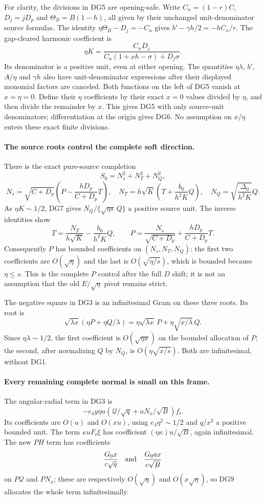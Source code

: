 For clarity, the divisions in DG5 are opening-safe. Write
$C_n=(1-r)C$, $D_j=jD_p$ and $\Theta_B=B(1-h)$, all given by their
unchanged unit-denominator source formulas. The identity
$\eta\Theta_B-D_j=-C_n$ gives
$b'-\gamma h/2=-hC_n/r$. The gap-cleared harmonic coefficient is
\[
 \eta K=\frac{C_nD_j}
 {C_n(1+xh-\sigma)+D_j\sigma}.
\]
Its denominator is a positive unit, even at either opening. The
quantities $\eta\lambda$, $b'$, $A/\eta$ and $\gamma h$ also have
unit-denominator expressions after their displayed monomial factors
are canceled. Both functions on the left of DG5 vanish at
$x=\eta=0$. Define their $\eta$ coefficients by their exact $x=0$
values divided by $\eta$, and then divide the remainder by $x$.
This gives DG5 with only source-unit denominators; differentiation at
the origin gives DG6. No assumption on $x/\eta$ enters these exact
finite divisions.

\paragraph{The source roots control the complete soft direction.}
There is the exact pure-source completion
\[
 S_0=N_s^2+N_T^2+N_Q^2,
\]
\[
 N_s=\sqrt{C+D_p}\left(P-\frac{hD_p}{C+D_p}T\right),
 \quad N_T=h\sqrt K\left(T+\frac{b_0}{h^2K}Q\right),
 \quad N_Q=\sqrt{\frac{\Delta_0}{h^2K}}Q.            \tag{DG8}
\]
As $\eta K\sim1/2$, DG7 gives
$N_Q/\{\sqrt{\eta s}\,Q\}$ a positive source unit. The inverse
identities show
\[
 T=\frac{N_T}{h\sqrt K}-\frac{b_0}{h^2K}Q,
 \qquad
 P=\frac{N_s}{\sqrt{C+D_p}}
                      +\frac{hD_p}{C+D_p}T.         \tag{DG9}
\]
Consequently $P$ has bounded coefficients on $(N_s,N_T,N_Q)$:
the first two coefficients are $O(\sqrt\eta)$ and the last is
$O(\sqrt{\eta/s})$, which is bounded because $\eta\le s$.
This is the complete $P$ control after the full $D$ shift; it is not
an assumption that the old $E/\sqrt\eta$ pivot remains strict.

The negative square in DG3 is an infinitesimal Gram on these three
roots. Its root is
\[
 \sqrt{\lambda x}(\eta P+\eta Q/\lambda)
   =\eta\sqrt{\lambda x}\,P+\eta\sqrt{x/\lambda}\,Q.
\]
Since $\eta\lambda\sim1/2$, the first coefficient is
$O(\sqrt{\eta x})$ on the bounded allocation of $P$; the second,
after normalizing $Q$ by $N_Q$, is
$O(\eta\sqrt{x/s})$. Both are infinitesimal, without DG1.

\paragraph{Every remaining complete normal is small on this frame.}
The angular-radial term in DG3 is
\[
 -e_4y\eta u\left(\mathcal Q/\sqrt q
                             +aN_x/\sqrt B\right)f_t.
\]
Its coefficients are $O(u)$ and $O(xu)$, using
$e_4\eta^2\sim1/2$ and $q/x^2$ a positive bounded unit.
The term $\kappa uF_t\xi$ has coefficient
$(\eta\kappa)u/\sqrt B$, again infinitesimal.
The new $PH$ term has coefficients
\[
 \frac{G_0x}{c\sqrt q}\quad\hbox{and}\quad
 \frac{G_0ax}{c\sqrt B}
\]
on $P\mathcal Q$ and $PN_x$; these are respectively
$O(\sqrt\eta)$ and $O(x\sqrt\eta)$, so DG9 allocates the whole
term infinitesimally.

